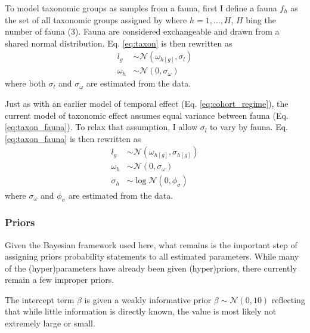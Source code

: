 \documentclass[12pt,letterpaper]{article}
\begin{document}
To model taxonomic groups as samples from a fauna, first I define a fauna \(f_{h}\) as the set of all taxonomic groups assigned by \citet{SepkoskiJr.1981a} where \(h = 1, \dots, H\), \(H\) bing the number of fauna (3). Fauna are considered exchangeable and drawn from a shared normal distribution. Eq. \ref{eq:taxon} is then rewritten as
\begin{equation}
  \begin{aligned}
    l_{g} &\sim \mathcal{N}(\omega_{h[g]}, \sigma_{l})\\
    \omega_{h} &\sim \mathcal{N}(0, \sigma_{\omega})
  \end{aligned}
  \label{eq:taxon_fauna}
\end{equation}
where both \(\sigma_{l}\) and \(\sigma_{\omega}\) are estimated from the data.

Just as with an earlier model of temporal effect (Eq. \ref{eq:cohort_regime}), the current model of taxonomic effect assumes equal variance between fauna (Eq. \ref{eq:taxon_fauna}). To relax that assumption, I allow \(\sigma_{l}\) to vary by fauna. Eq. \ref{eq:taxon_fauna} is then rewritten as
\begin{equation}
  \begin{aligned}
    l_{g} &\sim \mathcal{N}(\omega_{h[g]}, \sigma_{h[g]})\\
    \omega_{h} &\sim \mathcal{N}(0, \sigma_{\omega}) \\
    \sigma_{h} &\sim \log\mathcal{N}(0, \phi_{\sigma})
  \end{aligned}
  \label{eq:taxon_complex}
\end{equation}
where \(\sigma_{\omega}\) and \(\phi_{\sigma}\) are estimated from the data.


\subsubsection{Priors}
Given the Bayesian framework used here, what remains is the important step of assigning priors probability statements to all estimated parameters. While many of the (hyper)parameters have already been given (hyper)priors, there currently remain a few improper priors.

The intercept term \(\beta\) is given a weakly informative prior \(\beta \sim \mathcal{N}(0, 10)\) reflecting that while little information is directly known, the value is most likely not extremely large or small.
\end{document}
